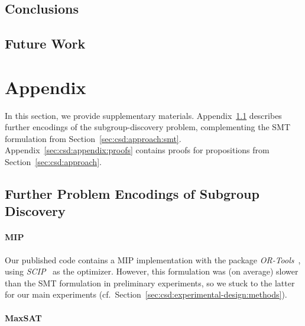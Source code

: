 \documentclass{article}
\theoremstyle{definition}
\begin{document}
\subsection{Conclusions}
\label{sec:csd:conclusion:conclusion}

\subsection{Future Work}
\label{sec:csd:conclusion:future-work}


\appendix

\section{Appendix}
\label{sec:csd:appendix}

In this section, we provide supplementary materials.
Appendix~\ref{sec:csd:appendix:further-encodings} describes further encodings of the subgroup-discovery problem, complementing the SMT formulation from Section~\ref{sec:csd:approach:smt}.
Appendix~\ref{sec:csd:appendix:proofs} contains proofs for propositions from Section~\ref{sec:csd:approach}.

\subsection{Further Problem Encodings of Subgroup Discovery}
\label{sec:csd:appendix:further-encodings}

\paragraph{MIP}

Our published code contains a MIP implementation with the package \emph{OR-Tools}~\cite{perron2022or-tools}, using \emph{SCIP}~\cite{bestuzheva2021scip} as the optimizer.
However, this formulation was (on average) slower than the SMT formulation in preliminary experiments, so we stuck to the latter for our main experiments (cf.~Section~\ref{sec:csd:experimental-design:methods}).

\paragraph{MaxSAT}
\end{document}
